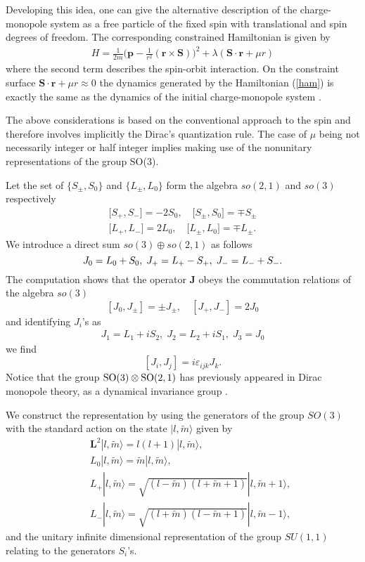 \documentclass[a4paper,twocolumn,aps,showpacs,showkeys]{revtex4}
\begin{document}
Developing this idea, one can give the alternative description of
the charge-monopole system as a free particle of the fixed spin
with translational and spin degrees of freedom. The corresponding
constrained Hamiltonian is given by
\begin{eqnarray}
H= \frac{1}{2m}\bigl(\mathbf p  - \frac{1}{r^2}(\mathbf r \times
{\mathbf S})\bigr)^2 + \lambda(\mathbf S \cdot \mathbf r + \mu r)
\label{ham}
\end{eqnarray}
where the second term describes the spin-orbit interaction. On the
constraint surface ${\mathbf S}\cdot{\mathbf r} + \mu{r} \approx 0$
the dynamics generated by the Hamiltonian (\ref{ham}) is exactly the same
as the dynamics of the initial charge-monopole system \cite{Ply}.

The above considerations is based on the conventional approach to
the spin and therefore involves implicitly the Dirac's
quantization rule. The case of $\mu$ being not necessarily integer
or half integer implies making use of the nonunitary
representations of the group SO(3).

Let the set of $\{S_{\pm},S_0\}$ and  $\{L_{\pm},L_0\}$ form the
algebra $so(2,1 )$ and $so(3)$ respectively
\begin{eqnarray}
{[}S_{+}, S_{-}] = -2S_0, \quad {[}S_{\pm}, S_0] = {\mp}S_{\pm} \\
{[}L_{+}, L_{-}] = 2L_0, \quad {[}L_{\pm}, L_0] = {\mp}L_{\pm}.
\end{eqnarray}
We introduce a direct sum $so(3)\oplus so(2,1)$ as follows
\begin{equation}
J_0 = L_0 + S_0, \; J_{+} = L_{+} - S_{+}, \; J_{-} = L_{-} + S_{-}.
\label{eq6}\\
\end{equation}
The computation shows that the operator $\mathbf J$ obeys the
commutation relations of the algebra $so(3)$
\[
[J_0,J_{\pm}] = \pm J_{\pm}, \quad [J_{+},J_{-}] = 2J_{0}
\]
and identifying $J_i$'s as
\begin{eqnarray}
J_{1} = L_{1} + iS_{2}, \; J_{2}
= L_{2} + iS_{1},\; J_3=J_0
\end{eqnarray}
we find
\[
[J_i,J_j] = i\varepsilon_{ijk} J_k.
\]
Notice that the group $\rm SO(3)\otimes SO(2,1)$ has previously
appeared in Dirac monopole theory, as a dynamical invariance group
\cite{Jac1}.

We construct the representation by using the generators of the
group $SO(3)$ with the standard action on the state $|l,\tilde m
\rangle$ given by
\begin{eqnarray*}
&&{\mathbf L}^2|l, \tilde{m}\rangle = l(l + 1)|l, \tilde{m}\rangle, \\
&&L_0|l, \tilde{m}\rangle = \tilde{m}|l, \tilde{m}\rangle,\\
&&L_{+}|l,
\tilde{m}\rangle = \sqrt{(l - \tilde{m})(l + \tilde{m} + 1)}|l, \tilde{m} +
1\rangle,\\
&&L_{-}|l, \tilde{m}\rangle = \sqrt{(l + \tilde{m})(l -
\tilde{m} + 1)}|l, \tilde{m} - 1\rangle,
\end{eqnarray*}
and the unitary infinite dimensional representation of the group
$SU(1, 1)$ relating to the generators $S_i$'s.
\end{document}
